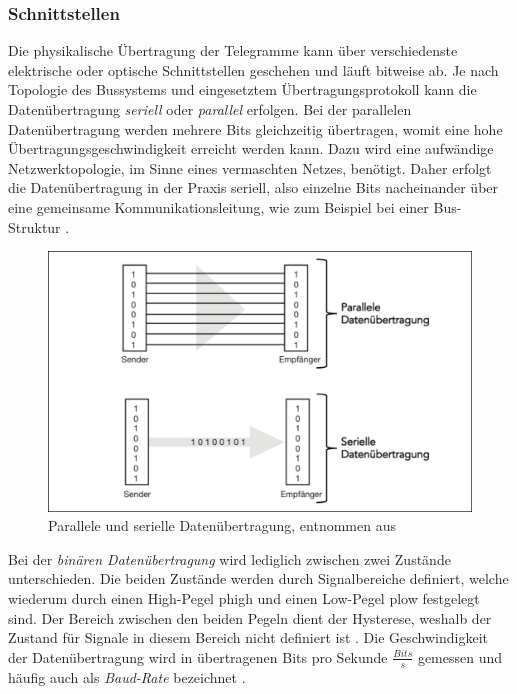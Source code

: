 \subsubsection{Schnittstellen}
\label{sub:schnitt}

Die physikalische Übertragung der Telegramme kann über verschiedenste elektrische oder optische Schnittstellen geschehen und läuft bitweise ab. Je nach Topologie des Bussystems und eingesetztem Übertragungsprotokoll kann die Datenübertragung \textit{seriell} oder \textit{parallel} erfolgen. Bei der parallelen Datenübertragung werden mehrere Bits gleichzeitig übertragen, womit eine hohe Übertragungsgeschwindigkeit erreicht werden kann. Dazu wird eine aufwändige Netzwerktopologie, im Sinne eines vermaschten Netzes, benötigt. Daher erfolgt die Datenübertragung in der Praxis seriell, also einzelne Bits nacheinander über eine gemeinsame Kommunikationsleitung, wie zum Beispiel bei einer Bus-Struktur \cite[S.~13]{sch08}.

\begin{figure}
\centering
\includegraphics[width=\textwidth]{abbildungen/20160314_seriell}
\caption[Parallele und serielle Datenübertragung]{Parallele und serielle Datenübertragung, entnommen aus \cite[S.~13]{sch08}}
\label{fig:seriell}
\end{figure}


Bei der \textit{binären Datenübertragung} wird lediglich zwischen zwei Zustände unterschieden. Die beiden Zustände werden durch Signalbereiche definiert, welche wiederum durch einen High-Pegel \gls{phigh} und einen Low-Pegel \gls{plow} festgelegt sind. Der Bereich zwischen den beiden Pegeln dient der Hysterese, weshalb der Zustand für Signale in diesem Bereich nicht definiert ist \cite[S.~9]{sch08}.
Die Geschwindigkeit der Datenübertragung wird in übertragenen Bits pro Sekunde $\frac{Bits}{s}$ gemessen und häufig auch als \textit{Baud-Rate} bezeichnet \cite[S.~22]{sch08}.


